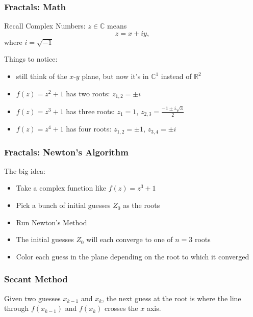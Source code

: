 \documentclass[10pt]{beamer}
\begin{document}
\begin{frame}
\frametitle{Fractals: Math}
Recall Complex Numbers: $z \in \mathbb{C}$ means
\begin{equation*}
  z = x + i y,
\end{equation*}
where $i = \sqrt{-1}$
\vspace{0.5cm}

Things to notice:
\begin{itemize}
  \item still think of the $x$-$y$ plane, but now it's in $\mathbb{C}^1$
  instead of $\mathbb{R}^2$
  \item $f(z) = z^2 + 1$ has two roots: $z_{1,2} = \pm i$
  \item $f(z) = z^3 + 1$ has three roots: $z_{1} = 1$, $z_{2,3}=\frac{-1\pm i \sqrt{3}}{2}$
  \item $f(z) = z^4 + 1$ has four roots: $z_{1,2} = \pm1$, $z_{3,4}=\pm i$
\end{itemize}
\end{frame}
\begin{frame}
\frametitle{Fractals: Newton's Algorithm}
The big idea:
\begin{itemize}
  \item Take a complex function like $f(z) = z^3 + 1$
  \item Pick a bunch of initial guesses $Z_0$ as the roots
  \item Run Newton's Method
  \item The initial guesses $Z_0$ will each converge to one of $n=3$ roots
  \item Color each guess in the plane depending on the root to which it converged
\end{itemize}
\begin{center}
\end{center}
\end{frame}
\begin{frame}
\frametitle{Secant Method}

\vspace{4ex}
\begin{center}
\end{center}

Given two guesses $x_{k-1}$ and $x_k$, the next guess at the root
is where the line through $f(x_{k-1})$ and $f(x_k)$
crosses the $x$ axis.



\end{frame}
\end{document}
